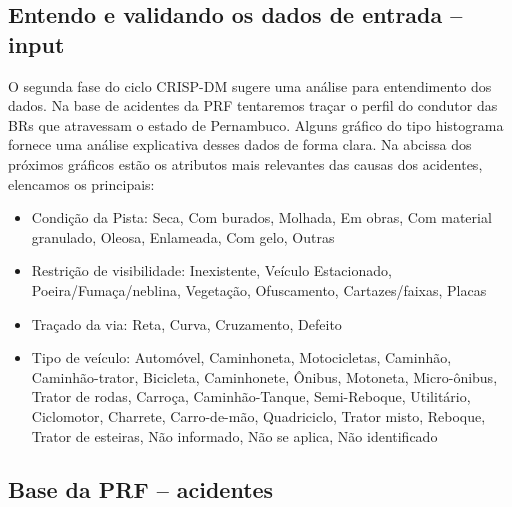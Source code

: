 \subsection{Entendo e validando os dados de entrada -- input}
O segunda fase do ciclo CRISP-DM sugere uma análise para entendimento dos dados.
Na base de acidentes da PRF tentaremos traçar o perfil do condutor das BRs que atravessam o estado de Pernambuco.
Alguns gráfico do tipo histograma fornece uma análise explicativa desses dados de forma clara.
Na abcissa dos próximos gráficos estão os atributos mais relevantes das causas dos acidentes, elencamos os principais:
\begin{itemize}
 \item Condição da Pista: {Seca, Com burados, Molhada, Em obras, Com material granulado, Oleosa, Enlameada, Com gelo, Outras}
 \item Restrição de visibilidade: {Inexistente, Veículo Estacionado, Poeira/Fumaça/neblina, Vegetação, Ofuscamento, Cartazes/faixas, Placas}
 \item Traçado da via: {Reta, Curva, Cruzamento, Defeito}
 \item Tipo de veículo: {Automóvel, Caminhoneta, Motocicletas, Caminhão, Caminhão-trator, Bicicleta, Caminhonete, Ônibus, Motoneta, Micro-ônibus, Trator
 de rodas, Carroça, Caminhão-Tanque, Semi-Reboque, Utilitário, Ciclomotor, Charrete, Carro-de-mão, Quadriciclo, Trator misto, Reboque, Trator de esteiras,
 Não informado, Não se aplica, Não identificado}
\end{itemize}

\subsection{Base da PRF -- acidentes}

